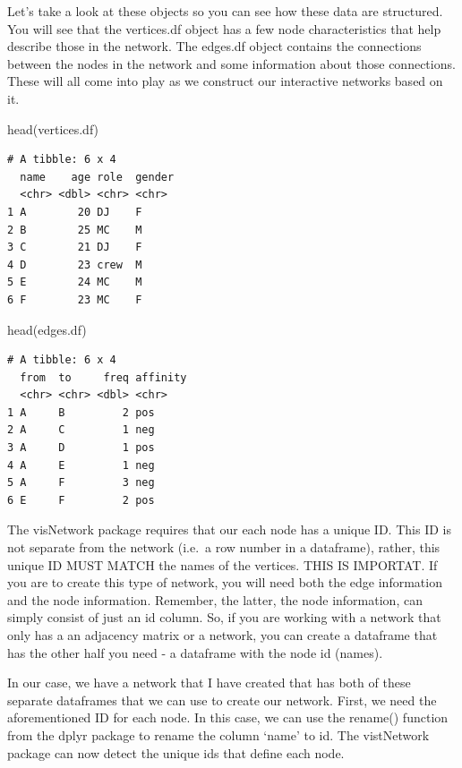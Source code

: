 \documentclass[
  letterpaper,
  DIV=11,
  numbers=noendperiod]{scrreprt}
\newenvironment{Shaded}{\begin{snugshade}}{\end{snugshade}}
\newcommand{\FunctionTok}[1]{\textcolor[rgb]{0.28,0.35,0.67}{#1}}
\newcommand{\NormalTok}[1]{\textcolor[rgb]{0.00,0.23,0.31}{#1}}
\begin{document}
Let's take a look at these objects so you can see how these data are
structured. You will see that the vertices.df object has a few node
characteristics that help describe those in the network. The edges.df
object contains the connections between the nodes in the network and
some information about those connections. These will all come into play
as we construct our interactive networks based on it.

\begin{Shaded}
\begin{Highlighting}[]
\FunctionTok{head}\NormalTok{(vertices.df)}
\end{Highlighting}
\end{Shaded}

\begin{verbatim}
# A tibble: 6 x 4
  name    age role  gender
  <chr> <dbl> <chr> <chr> 
1 A        20 DJ    F     
2 B        25 MC    M     
3 C        21 DJ    F     
4 D        23 crew  M     
5 E        24 MC    M     
6 F        23 MC    F     
\end{verbatim}

\begin{Shaded}
\begin{Highlighting}[]
\FunctionTok{head}\NormalTok{(edges.df)}
\end{Highlighting}
\end{Shaded}

\begin{verbatim}
# A tibble: 6 x 4
  from  to     freq affinity
  <chr> <chr> <dbl> <chr>   
1 A     B         2 pos     
2 A     C         1 neg     
3 A     D         1 pos     
4 A     E         1 neg     
5 A     F         3 neg     
6 E     F         2 pos     
\end{verbatim}

The visNetwork package requires that our each node has a unique ID. This
ID is not separate from the network (i.e.~a row number in a dataframe),
rather, this unique ID MUST MATCH the names of the vertices. THIS IS
IMPORTAT. If you are to create this type of network, you will need both
the edge information and the node information. Remember, the latter, the
node information, can simply consist of just an id column. So, if you
are working with a network that only has a an adjacency matrix or a
network, you can create a dataframe that has the other half you need - a
dataframe with the node id (names).

In our case, we have a network that I have created that has both of
these separate dataframes that we can use to create our network. First,
we need the aforementioned ID for each node. In this case, we can use
the rename() function from the dplyr package to rename the column `name'
to id. The vistNetwork package can now detect the unique ids that define
each node.
\end{document}

